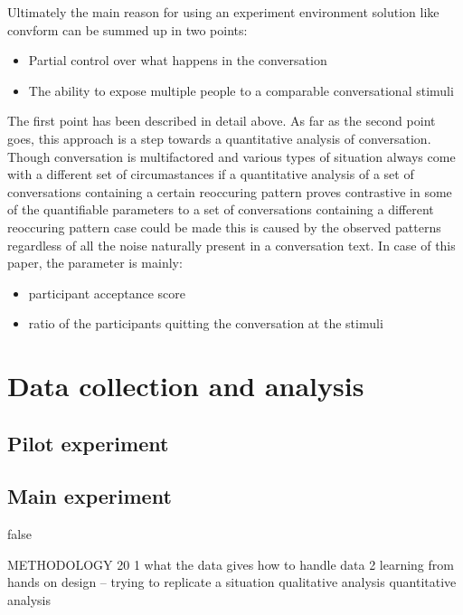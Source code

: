 \documentclass[12pt]{report}
\begin{document}
{Ultimately the main reason for using
an experiment environment solution like convform
can be summed up in two points:

\begin{itemize}
\item{Partial control over what happens in the conversation}
\item{The ability to expose multiple people to a comparable conversational stimuli}
\end{itemize}

The first point has been described in detail above.
As far as the second point goes,
this approach is a step towards
a quantitative analysis of conversation.
Though conversation is multifactored
and various types of situation
always come with a different set of circumastances
if a quantitative analysis of a set of conversations
containing a certain reoccuring pattern
proves contrastive in some of the quantifiable parameters
to a set of conversations containing a different reoccuring pattern
case could be made this is caused by the observed patterns
regardless of all the noise naturally present in a conversation text.
In case of this paper,
the parameter is mainly:

\begin{itemize}
\item{participant acceptance score}
\item{ratio of the participants quitting the conversation at the stimuli}
\end{itemize}







\chapter{Data collection and analysis}

\section{Pilot experiment}
\section{Main experiment}


\if false

METHODOLOGY 20
	1   what the data gives
	       how to handle data
	2 learning from
	    hands on design – trying to replicate a situation
		qualitative analysis
		quantitative analysis

}
\end{document}
